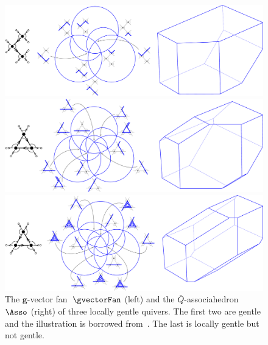 \documentclass{amsart}
\theoremstyle{definition}
\renewcommand{\b}[1]{\mathbf{#1}} %
\begin{document}
\begin{figure}[p]
	\capstart
	\centerline{\includegraphics[scale=.5]{fanAssociahedron1}}
	\vspace{.5cm}
	\centerline{\includegraphics[scale=.5]{fanAssociahedron2}}
	\vspace{.5cm}
	\centerline{\includegraphics[scale=.5]{fanAssociahedron3}}
	\caption{The $\b{g}$-vector fan~$\gvectorFan$ (left) and the $\bar Q$-associahedron~$\Asso$ (right) of three locally gentle quivers. The first two are gentle and the illustration is borrowed from~\cite{PaluPilaudPlamondon}. The last is locally gentle but not gentle.}
	\label{fig:fanAssociahedron}
\end{figure}




\label{sec:biblio}
\end{document}
